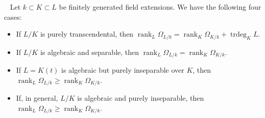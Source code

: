 \documentclass[11pt,a4paper,footinclude=true,headinclude=true]{scrbook} %
\DeclareMathOperator{\trdeg}{trdeg}
\DeclareMathOperator{\rank}{rank}
\newcommand{\<}{\langle}
\newcommand{\>}{\rangle}
\newenvironment{lemma}[2][]
{\renewcommand\theinnercustomlemma{#2}\innercustomlemma[#1]
\begin{mdframed}[backgroundcolor=gray!20]\ }
{\end{mdframed}\endinnercustomprop}
\begin{document}
\begin{lemma}{(8.B)}
    Let $k\subset K\subset L$ be finitely generated field extensions. We have the following four cases:
    \begin{itemize}
        \item[(i)] If $L/K$ is purely transcendental, then $\rank_L\Omega_{L/k}=\rank_K\Omega_{K/k}+\trdeg_KL$.
        \item[(ii)] If $L/K$ is algebraic and separable, then $\rank_L\Omega_{L/k}=\rank_K\Omega_{K/k}$.
        \item[(iii)] If $L=K(t)$ is algebraic but purely inseparable over $K$, then $\rank_L\Omega_{L/k}\geq\rank_K\Omega_{K/k}$.
        \item[(iv)] If, in general, $L/K$ is algebraic and purely inseparable, then $\rank_L\Omega_{L/k}\geq\rank_K\Omega_{K/k}$.
    \end{itemize}
\end{lemma}
\end{document}
